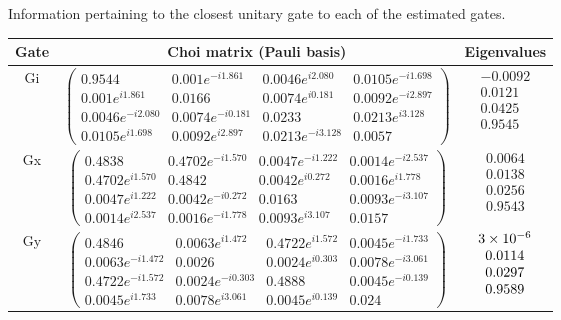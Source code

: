 {\begin{table}[h]
\begin{center}
\caption{Information pertaining to the closest unitary gate to each of the estimated gates.\label{bestCPTPGatesetClosestUnitaryTable}}
\end{center}
\end{table}


\begin{table}[h]
\begin{center}
\begin{tabular}[l]{|c|c|c|}
\hline
Gate & Choi matrix (Pauli basis) & Eigenvalues \\ \hline
Gi & $ \left(\!\!\begin{array}{cccc}
0.9544 & 0.001e^{-i1.861} & 0.0046e^{i2.080} & 0.0105e^{-i1.698} \\ 
0.001e^{i1.861} & 0.0166 & 0.0074e^{i0.181} & 0.0092e^{-i2.897} \\ 
0.0046e^{-i2.080} & 0.0074e^{-i0.181} & 0.0233 & 0.0213e^{i3.128} \\ 
0.0105e^{i1.698} & 0.0092e^{i2.897} & 0.0213e^{-i3.128} & 0.0057
 \end{array}\!\!\right) $
 & $ \begin{array}{c}
-0.0092 \\ 
0.0121 \\ 
0.0425 \\ 
0.9545
 \end{array} $
 \\ \hline
Gx & $ \left(\!\!\begin{array}{cccc}
0.4838 & 0.4702e^{-i1.570} & 0.0047e^{-i1.222} & 0.0014e^{-i2.537} \\ 
0.4702e^{i1.570} & 0.4842 & 0.0042e^{i0.272} & 0.0016e^{i1.778} \\ 
0.0047e^{i1.222} & 0.0042e^{-i0.272} & 0.0163 & 0.0093e^{-i3.107} \\ 
0.0014e^{i2.537} & 0.0016e^{-i1.778} & 0.0093e^{i3.107} & 0.0157
 \end{array}\!\!\right) $
 & $ \begin{array}{c}
0.0064 \\ 
0.0138 \\ 
0.0256 \\ 
0.9543
 \end{array} $
 \\ \hline
Gy & $ \left(\!\!\begin{array}{cccc}
0.4846 & 0.0063e^{i1.472} & 0.4722e^{i1.572} & 0.0045e^{-i1.733} \\ 
0.0063e^{-i1.472} & 0.0026 & 0.0024e^{i0.303} & 0.0078e^{-i3.061} \\ 
0.4722e^{-i1.572} & 0.0024e^{-i0.303} & 0.4888 & 0.0045e^{-i0.139} \\ 
0.0045e^{i1.733} & 0.0078e^{i3.061} & 0.0045e^{i0.139} & 0.024
 \end{array}\!\!\right) $
 & $ \begin{array}{c}
3\times 10^{-6} \\ 
0.0114 \\ 
0.0297 \\ 
0.9589
 \end{array} $
 \\ \hline
\end{tabular}


\end{center}
\end{table}}
